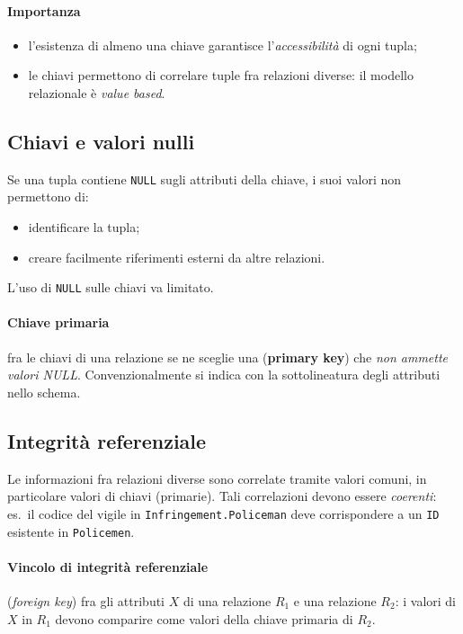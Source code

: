 \documentclass[a4paper,12pt]{article}
\begin{document}
\paragraph{Importanza}
\begin{itemize}
  \item l'esistenza di almeno una chiave garantisce l'\emph{accessibilità} di
    ogni tupla;
  \item le chiavi permettono di correlare tuple fra relazioni diverse: il
    modello relazionale è \emph{value based}.
\end{itemize}

\subsection{Chiavi e valori nulli}

Se una tupla contiene \texttt{NULL} sugli attributi della chiave, i suoi
valori non permettono di:
\begin{itemize}
  \item identificare la tupla;
  \item creare facilmente riferimenti esterni da altre relazioni.
\end{itemize}
L'uso di \texttt{NULL} sulle chiavi va limitato.

\paragraph{Chiave primaria} fra le chiavi di una relazione se ne sceglie una
(\textbf{primary key}) che \emph{non ammette valori NULL}. Convenzionalmente si
indica con la sottolineatura degli attributi nello schema.

\subsection{Integrità referenziale}

Le informazioni fra relazioni diverse sono correlate tramite valori comuni, in
particolare valori di chiavi (primarie). Tali correlazioni devono essere
\emph{coerenti}: es.\ il codice del vigile in \texttt{Infringement.Policeman}
deve corrispondere a un \texttt{ID} esistente in \texttt{Policemen}.

\paragraph{Vincolo di integrità referenziale} (\emph{foreign key}) fra gli
attributi $X$ di una relazione $R_1$ e una relazione $R_2$: i valori di $X$
in $R_1$ devono comparire come valori della chiave primaria di $R_2$.
\end{document}
